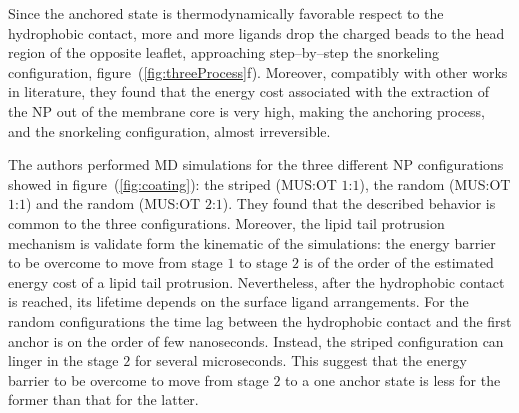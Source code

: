 Since the anchored state is thermodynamically favorable respect to the hydrophobic contact, more and more ligands drop the charged beads to the head region of the opposite leaflet, approaching step--by--step the snorkeling configuration, figure~(\ref{fig:threeProcess}f). Moreover, compatibly with other works in literature, they found that the energy cost associated with the extraction of the \ac{NP} out of the membrane core is very high, making the anchoring process, and the snorkeling configuration, almost irreversible.
 
The authors performed \ac{MD} simulations for the three different \ac{NP} configurations showed in figure~(\ref{fig:coating}): the striped (\ac{MUS}:\ac{OT} $1$:$1$), the random (\ac{MUS}:\ac{OT} $1$:$1$) and the random (\ac{MUS}:\ac{OT} $2$:$1$). They found that the described behavior is common to the three configurations. Moreover, the lipid tail protrusion mechanism is validate form the kinematic of the simulations: the energy barrier to be overcome to move from stage $1$ to stage $2$ is of the order of the estimated energy cost of a lipid tail protrusion. Nevertheless, after the hydrophobic contact is reached, its lifetime depends on the surface ligand arrangements. For the random configurations the time lag between the hydrophobic contact and the first anchor is on the order of few nanoseconds. Instead, the striped configuration can linger in the stage $2$ for several microseconds. This suggest that the energy barrier to be overcome to move from stage $2$ to a one anchor state is less for the former than that for the latter. 

